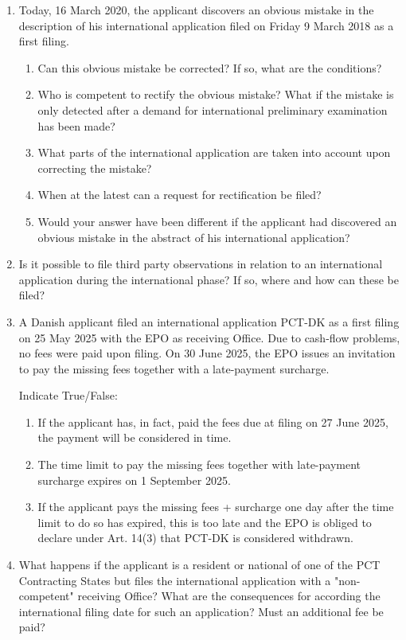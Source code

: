 \documentclass{report}
\begin{document}
\begin{enumerate}[label=\textbf{Question \arabic*}]
    \item %
    Today, 16 March 2020, the applicant discovers an obvious mistake in the description of his international application filed on Friday 9 March 2018 as a first filing.
    \begin{enumerate}[label=(\alph*)]
        \item Can this obvious mistake be corrected? If so, what are the conditions?
        \item Who is competent to rectify the obvious mistake? What if the mistake is only detected after a demand for international preliminary examination has been made?
        \item What parts of the international application are taken into account upon correcting the mistake?
        \item When at the latest can a request for rectification be filed?
        \item Would your answer have been different if the applicant had discovered an obvious mistake in the abstract of his international application?
    \end{enumerate}

    \item %
    Is it possible to file third party observations in relation to an international application during the international phase? If so, where and how can these be filed?

    \item %
    A Danish applicant filed an international application PCT-DK as a first filing on 25 May 2025 with the EPO as receiving Office. Due to cash-flow problems, no fees were paid upon filing. On 30 June 2025, the EPO issues an invitation to pay the missing fees together with a late-payment surcharge.

    \vspace{1em}
    Indicate True/False:
    \begin{enumerate}[label=(\alph*)]
        \item If the applicant has, in fact, paid the fees due at filing on 27 June 2025, the payment will be considered in time.
        \item The time limit to pay the missing fees together with late-payment surcharge expires on 1 September 2025.
        \item If the applicant pays the missing fees + surcharge one day after the time limit to do so has expired, this is too late and the EPO is obliged to declare under Art. 14(3) that PCT-DK is considered withdrawn.
    \end{enumerate}

    \item %
    What happens if the applicant is a resident or national of one of the PCT Contracting States but files the international application with a "non-competent" receiving Office? What are the consequences for according the international filing date for such an application? Must an additional fee be paid?

\end{enumerate}
\end{document}
